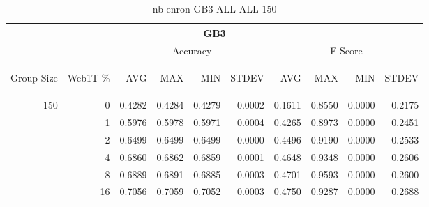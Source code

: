 \begin{center}
\begin{table}[htbp] 
 \begin{center}
\begin{tabular}{ | r | r | r | r | r | r | r | r | r | r |}
\hline
\multicolumn{10}{|c|}{GB3}\\
\hline
 & & \multicolumn{4}{|c|}{Accuracy} & \multicolumn{4}{|c|}{F-Score}\\ \cline{3-10}
\begin{sideways}Group Size\end{sideways} & \begin{sideways}Web1T \%\end{sideways} & \begin{sideways}AVG\end{sideways} & \begin{sideways}MAX\end{sideways} & \begin{sideways}MIN\end{sideways} & \begin{sideways}STDEV\end{sideways} & \begin{sideways}AVG\end{sideways} & \begin{sideways}MAX\end{sideways} & \begin{sideways}MIN\end{sideways} & \begin{sideways}STDEV\end{sideways}\\
\hline
\multirow{5}{*}{150}
 & 0 & 0.4282 & 0.4284 & 0.4279 & 0.0002 & 0.1611 & 0.8550 & 0.0000 & 0.2175\\ \cline{2-10}
 & 1 & 0.5976 & 0.5978 & 0.5971 & 0.0004 & 0.4265 & 0.8973 & 0.0000 & 0.2451\\ \cline{2-10}
 & 2 & 0.6499 & 0.6499 & 0.6499 & 0.0000 & 0.4496 & 0.9190 & 0.0000 & 0.2533\\ \cline{2-10}
 & 4 & 0.6860 & 0.6862 & 0.6859 & 0.0001 & 0.4648 & 0.9348 & 0.0000 & 0.2606\\ \cline{2-10}
 & 8 & 0.6889 & 0.6891 & 0.6885 & 0.0003 & 0.4701 & 0.9593 & 0.0000 & 0.2600\\ \cline{2-10}
 & 16 & 0.7056 & 0.7059 & 0.7052 & 0.0003 & 0.4750 & 0.9287 & 0.0000 & 0.2688\\ \cline{2-10}
\hline
\end{tabular}
\caption{nb-enron-GB3-ALL-ALL-150}
\label{table:nb-enron-GB3-ALL-ALL-150}
\end{center}
 \end{table}
\end{center}

